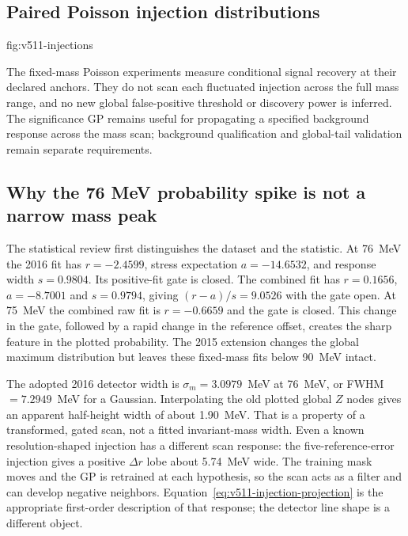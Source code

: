 \subsection{Paired Poisson injection distributions}
{fig:v511-injections}
\FloatBarrier

The fixed-mass Poisson experiments measure conditional signal recovery
at their declared anchors. They do not scan each fluctuated injection
across the full mass range, and no new global false-positive threshold or
discovery power is inferred. The significance GP remains useful for
propagating a specified background response across the mass scan;
background qualification and global-tail validation remain separate
requirements.
\FloatBarrier

\subsection{Why the 76 MeV probability spike is not a narrow mass peak}
\label{app:v504-width-review}
The statistical review first distinguishes the dataset and the statistic.
At 76~MeV the 2016 fit has $r=-2.4599$, stress expectation
$a=-14.6532$, and response width $s=0.9804$. Its positive-fit gate is
closed. The combined fit has $r=0.1656$, $a=-8.7001$ and $s=0.9794$,
giving $(r-a)/s=9.0526$ with the gate open. At 75~MeV the combined
raw fit is $r=-0.6659$ and the gate is closed. This change in the gate,
followed by a rapid change in the reference offset, creates the sharp
feature in the plotted probability. The 2015 extension changes the global
maximum distribution but leaves these fixed-mass fits below 90~MeV intact.

The adopted 2016 detector width is $\sigma_m=3.0979$~MeV at 76~MeV,
or FWHM $=7.2949$~MeV for a Gaussian. Interpolating the old plotted global
$Z$ nodes gives an apparent half-height width of about 1.90~MeV. That is
a property of a transformed, gated scan, not a fitted invariant-mass width.
Even a known resolution-shaped injection has a different scan response:
the five-reference-error injection gives a positive $\Delta r$ lobe about
5.74~MeV wide. The training mask moves and the GP is retrained at each
hypothesis, so the scan acts as a filter and can develop negative neighbors.
Equation~\eqref{eq:v511-injection-projection} is the appropriate first-order
description of that response; the detector line shape is a different object.

